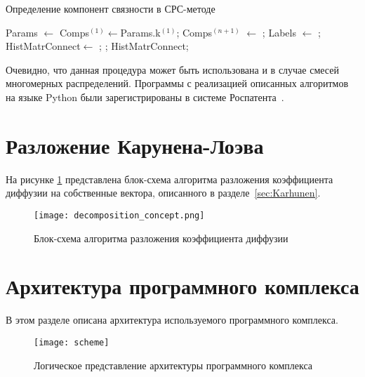 \begin{algorithm}[!h]
	\caption{Определение компонент связности в СРС-методе}
	\label{AlgConnect}
	\begin{algorithmic}[1]
		\State Params $\gets$
		\State {}
		\State  Comps$^{(1)}$$\gets$Params.k$^{(1)}$;
		\State Comps$^{(n+1)}$ $\gets$ ;
		\EndFor
		\State {}
		\State Labels $\gets$ ;
		\State {}
		\State HistMatrConnect$\gets$ ;	
		\State {};
		\State \Return HistMatrConnect;
		\EndFunction
	\end{algorithmic}
\end{algorithm}

Очевидно, что данная процедура может быть использована и в случае смесей многомерных распределений. 
Программы с реализацией описанных алгоритмов на языке Python были зарегистрированы в системе Роспатента~\cite{progbib4, progbib5}.

\section{Разложение Карунена-Лоэва}
\label{sec:AlgoKarhunen}
На рисунке \ref{fig:KarhunenAlgo} представлена блок-схема алгоритма разложения коэффициента диффузии на собственные вектора, описанного в разделе~\ref{sec:Karhunen}.
\begin{figure}
	\centering
	\texttt{[image: decomposition\_concept.png]}
	\caption{Блок-схема алгоритма разложения коэффициента диффузии}
	\label{fig:KarhunenAlgo}
\end{figure}



\section{Архитектура программного комплекса}
В этом разделе описана архитектура используемого программного комплекса.


\begin{figure}[!h]
	\centering
	\texttt{[image: scheme]}
	\caption{Логическое представление архитектуры программного комплекса}\label{fig:app_scheme}
\end{figure}


